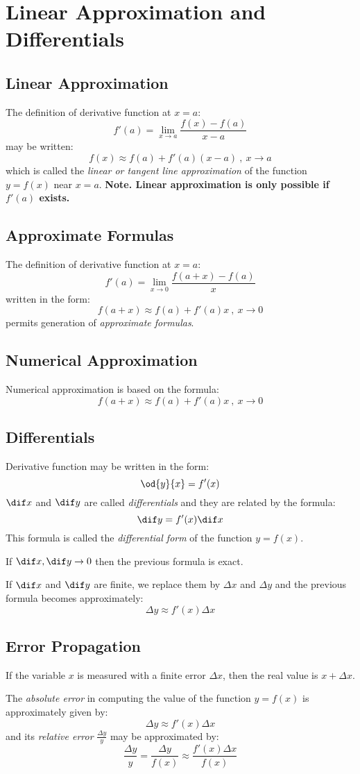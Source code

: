 \section{Linear Approximation and Differentials}
\subsection{Linear Approximation}
	The definition of derivative function at $x=a$:
	\[f'(a) = \lim_{x \to a} \frac{f(x) - f(a)}{x-a}\]
	may be written:
	\[f(x) \approx f(a) + f'(a)(x-a)\ ,\ x \to a\]
	which is called the \emph{linear or tangent line approximation} of the function $y=f(x)$ near $x=a$.
	\textbf{Note. Linear approximation is only possible if $f'(a)$ exists.}
\subsection{Approximate Formulas}
	The definition of derivative function at $x=a$:
	\[f'(a) = \lim_{x \to 0} \frac{f(a+x) - f(a)}{x}\]
	written in the form:
	\[f(a+x) \approx f(a) + f'(a)x\ ,\ x \to 0\]
	permits generation of \emph{approximate formulas}.
\subsection{Numerical Approximation}
	Numerical approximation is based on the formula:
	\[f(a+x) \approx f(a) + f'(a)x\ ,\ x \to 0\]
\subsection{Differentials}
	Derivative function may be written in the form:
	\[\od{y}{x} = f'(x)\]
	$\dif x$ and $\dif y$ are called \emph{differentials} and they are related by the formula:
	\[\dif y = f'(x) \dif x\]
	This formula is called the \emph{differential form} of the function $y = f(x)$.

	If $\dif x, \dif y \to 0$ then the previous formula is exact.

	If $\dif x$ and $\dif y$ are finite, we replace them by $\Delta x$ and $\Delta y$ and the previous formula becomes approximately:
	\[\Delta y \approx f'(x) \Delta x\]
\subsection{Error Propagation}
	If the variable $x$ is measured with a finite error $\Delta x$, then the real value is $x + \Delta x$.

	The \emph{absolute error} in computing the value of the function $y = f(x)$ is approximately given by:
	\[\Delta y \approx f'(x)\Delta x\]
	and its \emph{relative error} $\frac{\Delta y}{y}$ may be approximated by:
	\[\frac{\Delta y}{y} = \frac{\Delta y}{f(x)} \approx \frac{f'(x)\Delta x}{f(x)}\]
